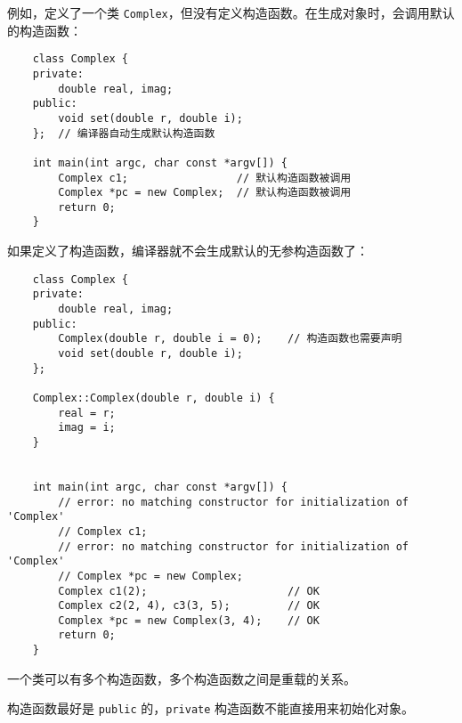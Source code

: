 \documentclass[UTF8]{ctexart}
\begin{document}
例如，定义了一个类 \texttt{Complex}，但没有定义构造函数。在生成对象时，会调用默认的构造函数：
\begin{verbatim}
    class Complex {
    private:
        double real, imag;
    public:
        void set(double r, double i);
    };  // 编译器自动生成默认构造函数

    int main(int argc, char const *argv[]) {
        Complex c1;                 // 默认构造函数被调用
        Complex *pc = new Complex;  // 默认构造函数被调用
        return 0;
    }
\end{verbatim}

如果定义了构造函数，编译器就不会生成默认的无参构造函数了：
\begin{verbatim}
    class Complex {
    private:
        double real, imag;
    public:
        Complex(double r, double i = 0);    // 构造函数也需要声明
        void set(double r, double i);
    };

    Complex::Complex(double r, double i) {
        real = r;
        imag = i;
    }


    int main(int argc, char const *argv[]) {
        // error: no matching constructor for initialization of 'Complex'
        // Complex c1;
        // error: no matching constructor for initialization of 'Complex'
        // Complex *pc = new Complex;
        Complex c1(2);                      // OK
        Complex c2(2, 4), c3(3, 5);         // OK
        Complex *pc = new Complex(3, 4);    // OK
        return 0;
    }
\end{verbatim}

一个类可以有多个构造函数，多个构造函数之间是重载的关系。

构造函数最好是 \texttt{public} 的，\texttt{private} 构造函数不能直接用来初始化对象。
\end{document}
